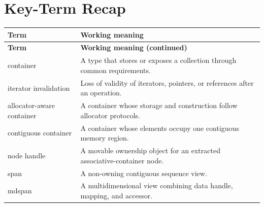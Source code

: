 \documentclass[11pt,letterpaper]{article}
\begin{document}
\section{Key-Term Recap}
\begin{longtable}{@{}>{\RaggedRight\arraybackslash}p{}>{\RaggedRight\arraybackslash}p{}@{}}\toprule\textbf{Term} & \textbf{Working meaning}\\\midrule\endfirsthead\toprule\textbf{Term} & \textbf{Working meaning (continued)}\\\midrule\endhead\bottomrule\endfoot
container & A type that stores or exposes a collection through common requirements.\\
iterator invalidation & Loss of validity of iterators, pointers, or references after an operation.\\
allocator-aware container & A container whose storage and construction follow allocator protocols.\\
contiguous container & A container whose elements occupy one contiguous memory region.\\
node handle & A movable ownership object for an extracted associative-container node.\\
span & A non-owning contiguous sequence view.\\
mdspan & A multidimensional view combining data handle, mapping, and accessor.\\
\end{longtable}
\end{document}
